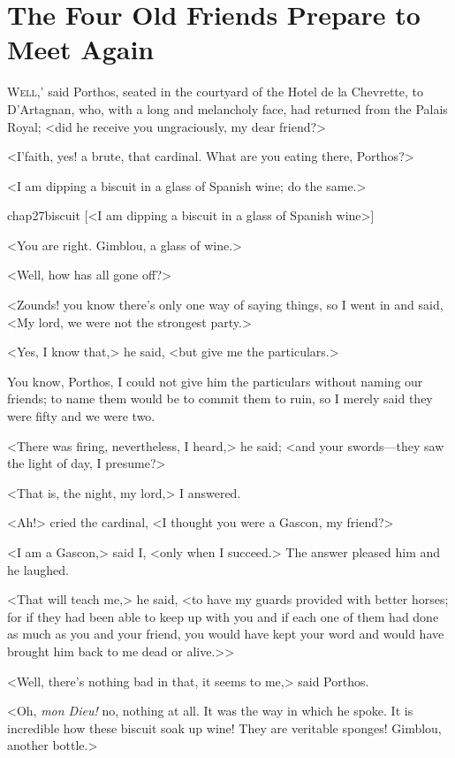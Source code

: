 \chapter{The Four Old Friends Prepare to Meet Again}

 \lettrine[ante=`]{W}{ell},' said Porthos, seated in the courtyard of the Hotel de la Chevrette, to D'Artagnan, who, with a long and melancholy face, had returned from the Palais Royal; <did he receive you ungraciously, my dear friend?>

\zz
<I'faith, yes! a brute, that cardinal. What are you eating there, Porthos?>

<I am dipping a biscuit in a glass of Spanish wine; do the same.>

\begin{bwbigpic}
	[\basicscale] 
	{chap27biscuit}
	[<I am dipping a biscuit in a glass of Spanish wine>]
\end{bwbigpic}

<You are right. Gimblou, a glass of wine.>

<Well, how has all gone off?>

<Zounds! you know there's only one way of saying things, so I went in and said, <My lord, we were not the strongest party.>

<Yes, I know that,> he said, <but give me the particulars.>

You know, Porthos, I could not give him the particulars without naming our friends; to name them would be to commit them to ruin, so I merely said they were fifty and we were two.

<There was firing, nevertheless, I heard,> he said; <and your swords—they saw the light of day, I presume?>

<That is, the night, my lord,> I answered.

<Ah!> cried the cardinal, <I thought you were a Gascon, my friend?>

<I am a Gascon,> said I, <only when I succeed.> The answer pleased him and he laughed.

<That will teach me,> he said, <to have my guards provided with better horses; for if they had been able to keep up with you and if each one of them had done as much as you and your friend, you would have kept your word and would have brought him back to me dead or alive.>>

<Well, there's nothing bad in that, it seems to me,> said Porthos.

<Oh, \textit{mon Dieu!} no, nothing at all. It was the way in which he spoke. It is incredible how these biscuit soak up wine! They are veritable sponges! Gimblou, another bottle.>

